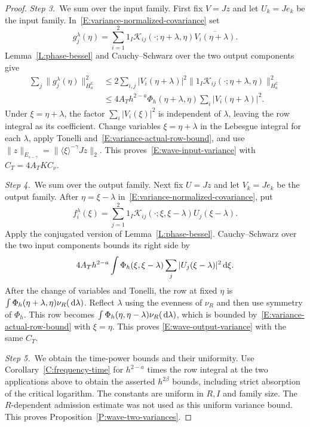 \begin{proof}
  \medskip
  \noindent\textit{Step 3.~}We sum over the input family.
  First fix $V = Jz$ and let $U_k = Je_k$ be the input family.
  In~\eqref{E:variance-normalized-covariance} set
  \[
    g_j^\lambda(\eta) = \sum_{i=1}^2
    1_I\mathcal{K}_{ij}(\cdot;\eta+\lambda,\eta)
    \overline{V_i(\eta+\lambda)}.
  \]
  Lemma~\ref{L:phase-bessel} and Cauchy--Schwarz over the two output components
  give
  \begin{align*}
    \sum_j\|g_j^\lambda(\eta)\|_{H_a^{\mathbb{C}}}^2
    &\le 2\sum_{i,j}|V_i(\eta+\lambda)|^2
    \|1_I\mathcal{K}_{ij}(\cdot;\eta+\lambda,\eta)\|_{H_a^{\mathbb{C}}}^2\\
    &\le 4A_T h^{2-a}\Phi_h(\eta+\lambda,\eta)
    \sum_i|V_i(\eta+\lambda)|^2.
  \end{align*}
  Under $\xi=\eta+\lambda$, the factor $\sum_i|V_i(\xi)|^2$ is independent of
  $\lambda$, leaving the row integral as its coefficient.
  Change variables $\xi = \eta+\lambda$ in the Lebesgue integral for each
  $\lambda$, apply Tonelli and~\eqref{E:variance-actual-row-bound}, and use
  $\|z\|_{E_{s-\gamma}} = \|\langle\xi\rangle^{-\gamma}Jz\|_2$. This
  proves~\eqref{E:wave-input-variance} with $C_T = 4A_TKC_\nu$.

  \medskip
  \noindent\textit{Step 4.~}We sum over the output family.
  Next fix $U = Jz$ and let $V_k = Je_k$ be the output family. After $\eta =
  \xi-\lambda$ in~\eqref{E:variance-normalized-covariance}, put
  \[
    f_i^\lambda(\xi) = \sum_{j=1}^2
    1_I\mathcal{K}_{ij}(\cdot;\xi,\xi-\lambda)U_j(\xi-\lambda).
  \]
  Apply the conjugated version of Lemma~\ref{L:phase-bessel}. Cauchy--Schwarz
  over the two input components bounds its right side by
  \[
    4A_T h^{2-a}\int\Phi_h(\xi,\xi-\lambda)
    \sum_j|U_j(\xi-\lambda)|^2\,\mathrm{d}\xi.
  \]
  After the change of variables and Tonelli, the row at fixed $\eta$ is
  $\int\Phi_h(\eta+\lambda,\eta)\nu_R(\,\mathrm{d}\lambda)$. Reflect $\lambda$ using the
  evenness of $\nu_R$ and then use symmetry of $\Phi_h$. This row becomes
  $\int\Phi_h(\eta,\eta-\lambda)\nu_R(\,\mathrm{d}\lambda)$, which is bounded
  by~\eqref{E:variance-actual-row-bound} with $\xi = \eta$. This proves
  \eqref{E:wave-output-variance} with the same $C_T$.

  \medskip
  \noindent\textit{Step 5.~}We obtain the time-power bounds and their
  uniformity.
  Use Corollary~\ref{C:frequency-time} for $h^{2-a}$ times the row integral at
  the two applications above to obtain the asserted $h^{2\beta}$ bounds,
  including strict absorption of the critical logarithm. The constants are
  uniform in $R,I$ and family size. The $R$-dependent admission estimate was not
  used as this uniform variance bound. This proves
  Proposition~\ref{P:wave-two-variances}.
\end{proof}

